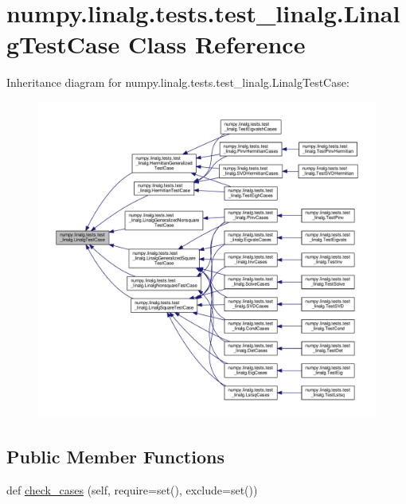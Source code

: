 \hypertarget{classnumpy_1_1linalg_1_1tests_1_1test__linalg_1_1LinalgTestCase}{}\section{numpy.\+linalg.\+tests.\+test\+\_\+linalg.\+Linalg\+Test\+Case Class Reference}
\label{classnumpy_1_1linalg_1_1tests_1_1test__linalg_1_1LinalgTestCase}


Inheritance diagram for numpy.\+linalg.\+tests.\+test\+\_\+linalg.\+Linalg\+Test\+Case\+:
\nopagebreak
\begin{figure}[H]
\begin{center}
\leavevmode
\includegraphics[width=350pt]{classnumpy_1_1linalg_1_1tests_1_1test__linalg_1_1LinalgTestCase__inherit__graph}
\end{center}
\end{figure}
\subsection*{Public Member Functions}
\begin{DoxyCompactItemize}
\item 
def \hyperlink{classnumpy_1_1linalg_1_1tests_1_1test__linalg_1_1LinalgTestCase_aebaf70d155f43fbcb5481e9a24ed00c9}{check\+\_\+cases} (self, require=set(), exclude=set())
\end{DoxyCompactItemize}
